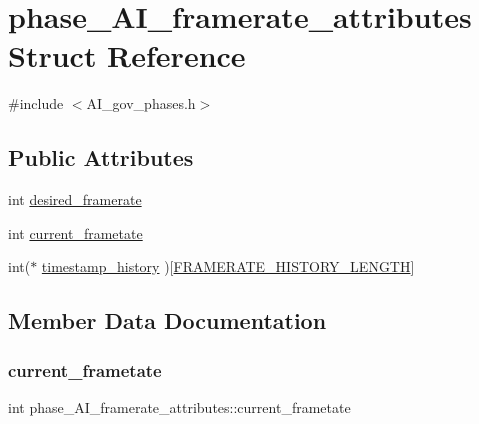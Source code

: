 \hypertarget{structphase__AI__framerate__attributes}{}\section{phase\+\_\+\+A\+I\+\_\+framerate\+\_\+attributes Struct Reference}
\label{structphase__AI__framerate__attributes}


{\ttfamily \#include $<$A\+I\+\_\+gov\+\_\+phases.\+h$>$}

\subsection*{Public Attributes}
\begin{DoxyCompactItemize}
\item 
int \hyperlink{structphase__AI__framerate__attributes_af07b98dcd629f520f2187503dac84ff2}{desired\+\_\+framerate}
\item 
int \hyperlink{structphase__AI__framerate__attributes_af6a096739a087a0de642e66228cd1c63}{current\+\_\+frametate}
\item 
int($\ast$ \hyperlink{structphase__AI__framerate__attributes_a783883ddc86f857b337e8daab6e794ff}{timestamp\+\_\+history} )\mbox{[}\hyperlink{AI__gov__phases_8h_a94b51f0f175147023f02be6ece8d249b}{F\+R\+A\+M\+E\+R\+A\+T\+E\+\_\+\+H\+I\+S\+T\+O\+R\+Y\+\_\+\+L\+E\+N\+G\+TH}\mbox{]}
\end{DoxyCompactItemize}


\subsection{Member Data Documentation}
\mbox{\label{structphase__AI__framerate__attributes_af6a096739a087a0de642e66228cd1c63}} 
\subsubsection{\texorpdfstring{current\+\_\+frametate}{current\_frametate}}
{\footnotesize\ttfamily int phase\+\_\+\+A\+I\+\_\+framerate\+\_\+attributes\+::current\+\_\+frametate}

